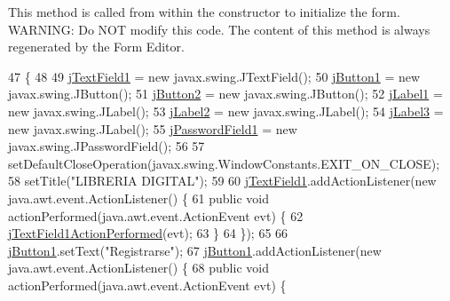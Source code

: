 This method is called from within the constructor to initialize the form. W\+A\+R\+N\+I\+NG\+: Do N\+OT modify this code. The content of this method is always regenerated by the Form Editor. 
\begin{DoxyCode}
47                                   \{
48 
49         \mbox{\hyperlink{class_interfaz_package_1_1_interfaz_inicio_a6c0a79d5c225c996fd8e03141682afe7}{jTextField1}} = \textcolor{keyword}{new} javax.swing.JTextField();
50         \mbox{\hyperlink{class_interfaz_package_1_1_interfaz_inicio_ac4f7e3c32cd3ffd80b806828426752a5}{jButton1}} = \textcolor{keyword}{new} javax.swing.JButton();
51         \mbox{\hyperlink{class_interfaz_package_1_1_interfaz_inicio_a0b17a44506b3f0598b3edabaae5099ec}{jButton2}} = \textcolor{keyword}{new} javax.swing.JButton();
52         \mbox{\hyperlink{class_interfaz_package_1_1_interfaz_inicio_a6fa5563033504d87402e1abe1b520bc2}{jLabel1}} = \textcolor{keyword}{new} javax.swing.JLabel();
53         \mbox{\hyperlink{class_interfaz_package_1_1_interfaz_inicio_a57d053ea1c64fdb320d8930aaf4861e9}{jLabel2}} = \textcolor{keyword}{new} javax.swing.JLabel();
54         \mbox{\hyperlink{class_interfaz_package_1_1_interfaz_inicio_a680b59c8dabd737e6017bcb2fb35d93a}{jLabel3}} = \textcolor{keyword}{new} javax.swing.JLabel();
55         \mbox{\hyperlink{class_interfaz_package_1_1_interfaz_inicio_a8fde0bb0a462417298eaf6468976a838}{jPasswordField1}} = \textcolor{keyword}{new} javax.swing.JPasswordField();
56 
57         setDefaultCloseOperation(javax.swing.WindowConstants.EXIT\_ON\_CLOSE);
58         setTitle(\textcolor{stringliteral}{"LIBRERIA DIGITAL"});
59 
60         \mbox{\hyperlink{class_interfaz_package_1_1_interfaz_inicio_a6c0a79d5c225c996fd8e03141682afe7}{jTextField1}}.addActionListener(\textcolor{keyword}{new} java.awt.event.ActionListener() \{
61             \textcolor{keyword}{public} \textcolor{keywordtype}{void} actionPerformed(java.awt.event.ActionEvent evt) \{
62                 \mbox{\hyperlink{class_interfaz_package_1_1_interfaz_inicio_ae2b72822ed503b0e83050f35f8efd996}{jTextField1ActionPerformed}}(evt);
63             \}
64         \});
65 
66         \mbox{\hyperlink{class_interfaz_package_1_1_interfaz_inicio_ac4f7e3c32cd3ffd80b806828426752a5}{jButton1}}.setText(\textcolor{stringliteral}{"Registrarse"});
67         \mbox{\hyperlink{class_interfaz_package_1_1_interfaz_inicio_ac4f7e3c32cd3ffd80b806828426752a5}{jButton1}}.addActionListener(\textcolor{keyword}{new} java.awt.event.ActionListener() \{
68             \textcolor{keyword}{public} \textcolor{keywordtype}{void} actionPerformed(java.awt.event.ActionEvent evt) \{

\end{DoxyCode}
